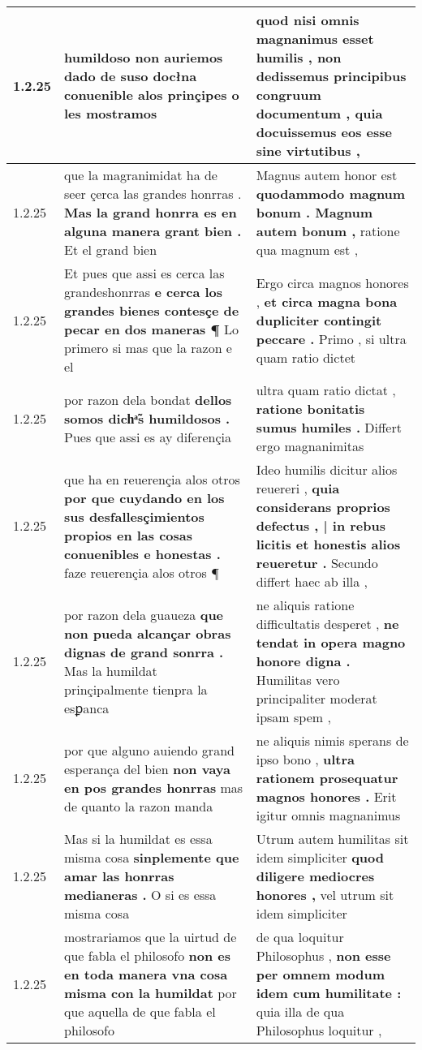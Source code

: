 \begin{tabular}{|p{1cm}|p{6.5cm}|p{6.5cm}|}
1.2.25 & humildoso non auriemos dado de suso \textbf{ docłna conuenible alos prinçipes } o les mostramos & quod nisi omnis magnanimus esset humilis , \textbf{ non dedissemus principibus congruum documentum , } quia docuissemus eos esse sine virtutibus , \\\hline
1.2.25 & que la magranimidat ha de seer çerca las grandes honrras . \textbf{ Mas la grand honrra es en alguna manera grant bien . } Et el grand bien & Magnus autem honor est \textbf{ quodammodo magnum bonum . Magnum autem bonum , } ratione qua magnum est , \\\hline
1.2.25 & Et pues que assi es cerca las grandeshonrras \textbf{ e cerca los grandes bienes contesçe de pecar en dos maneras ¶ } Lo primero si mas que la razon e el & Ergo circa magnos honores , \textbf{ et circa magna bona dupliciter contingit peccare . } Primo , si ultra quam ratio dictet \\\hline
1.2.25 & por razon dela bondat \textbf{ dellos somos dichͣ̃s humildosos . } Pues que assi es ay diferençia & ultra quam ratio dictat , \textbf{ ratione bonitatis sumus humiles . } Differt ergo magnanimitas \\\hline
1.2.25 & que ha en reuerençia alos otros \textbf{ por que cuydando en los sus desfallesçimientos propios en las cosas conuenibles e honestas . } faze reuerençia alos otros ¶ & Ideo humilis dicitur alios reuereri , \textbf{ quia considerans proprios defectus , | in rebus licitis et honestis alios reueretur . } Secundo differt haec ab illa , \\\hline
1.2.25 & por razon dela guaueza \textbf{ que non pueda alcançar obras dignas de grand sonrra . } Mas la humildat prinçipalmente tienpra la esꝑanca & ne aliquis ratione difficultatis desperet , \textbf{ ne tendat in opera magno honore digna . } Humilitas vero principaliter moderat ipsam spem , \\\hline
1.2.25 & por que alguno auiendo grand esperança del bien \textbf{ non vaya en pos grandes honrras } mas de quanto la razon manda & ne aliquis nimis sperans de ipso bono , \textbf{ ultra rationem prosequatur magnos honores . } Erit igitur omnis magnanimus \\\hline
1.2.25 & Mas si la humildat es essa misma cosa \textbf{ sinplemente que amar las honrras medianeras . } O si es essa misma cosa & Utrum autem humilitas sit idem simpliciter \textbf{ quod diligere mediocres honores , } vel utrum sit idem simpliciter \\\hline
1.2.25 & mostrariamos que la uirtud de que fabla el philosofo \textbf{ non es en toda manera vna cosa misma con la humildat } por que aquella de que fabla el philosofo & de qua loquitur Philosophus , \textbf{ non esse per omnem modum idem cum humilitate : } quia illa de qua Philosophus loquitur , \\\hline

\end{tabular}
